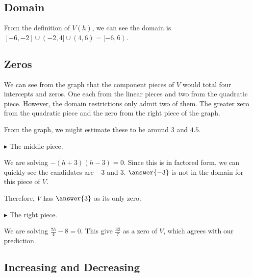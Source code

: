 \documentclass{ximera}
\begin{document}
\subsection{Domain} 

From the definition of $V(h)$, we can see the domain is $[-6, -2] \cup (-2, 4] \cup (4,6) = [-6, 6)$.



\subsection{Zeros} 

We can see from the graph that the component pieces of $V$ would total four intercepts and zeros. One each from the linear pieces and two from the quadratic piece.  However, the domain restrictions only admit two of them.  The greater zero from the quadratic piece and the zero from the right piece of the graph.

From the graph, we might estimate these to be around $3$ and $4.5$.







$\blacktriangleright$ The middle piece. 

We are solving $-(h+3)(h-3) = 0$.  Since this is in factored form, we can quickly see the candidates are $-3$ and $3$.  $\answer{-3}$ is not in the domain for this piece of $V$.

Therefore, $V$ has $\answer{3}$ as its only zero.




$\blacktriangleright$ The right piece. 

We are solving $\frac{7h}{4} - 8 = 0$.  This give $\frac{32}{7}$ as a zero of $V$, which agrees with our prediction.









\subsection{Increasing and Decreasing} 
\end{document}
